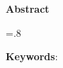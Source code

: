 


\pagestyle{empty}

\begin{latin}
	
	\begin{center}
		\textbf{Abstract}
	\end{center}
	\baselineskip=.8\baselineskip
	
	
	\bigskip\noindent\textbf{Keywords}:

	
\end{latin}

\newpage